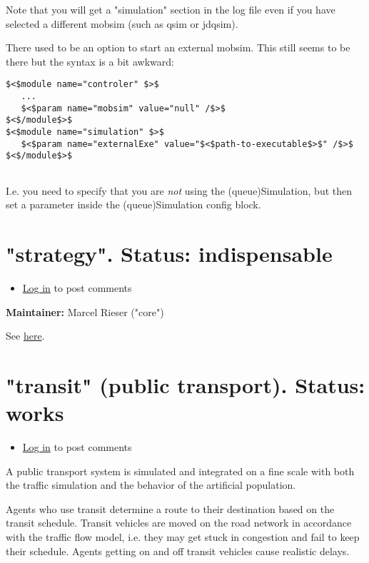 \documentclass[a4paper,11pt]{report}
\begin{document}
Note that you will get a "simulation" section in the log file even if  you have selected a different mobsim (such as qsim or jdqsim).

There used to be an option to start an external mobsim. This still seems to be there but the syntax is a bit awkward:
\begin{verbatim}
$<$module name="controler" $>$
   ...
   $<$param name="mobsim" value="null" /$>$
$<$/module$>$
$<$module name="simulation" $>$
   $<$param name="externalExe" value="$<$path-to-executable$>$" /$>$
$<$/module$>$


\end{verbatim}

I.e. you need to specify that you are \emph{not} using the (queue)Simulation, but then set a parameter inside the (queue)Simulation config block.

\vfill\eject
\section{"strategy". Status: indispensable}
\begin{itemize}
	\item \href{http://www.matsim.org/user/login?destination=comment/reply/400%23comment-form}{Log in} to post comments
\end{itemize}

\textbf{Maintainer:} Marcel Rieser ("core")

See \href{http://matsim.org/node/478}{here}.

\vfill\eject
\section{"transit" (public transport).  Status: works}
\begin{itemize}
	\item \href{http://www.matsim.org/user/login?destination=comment/reply/385%23comment-form}{Log in} to post comments
\end{itemize}

A  public transport system is simulated and integrated on a fine scale  with both the traffic simulation and the behavior of the artificial  population.

Agents who use transit determine a route to their destination based  on the transit schedule. Transit vehicles are moved on the road network  in accordance with the traffic flow model, i.e. they may get stuck in  congestion and fail to keep their schedule. Agents getting on and off  transit vehicles cause realistic delays.
\end{document}

